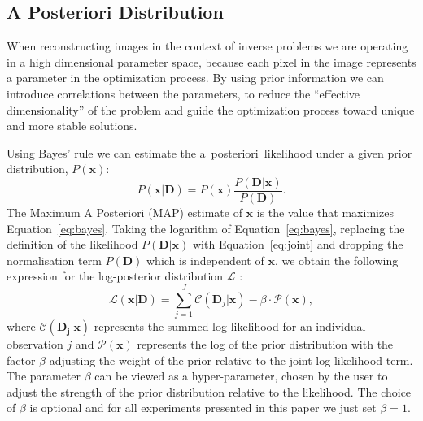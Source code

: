 \documentclass[twocolumn]{aastex631}
\newcommand{\aposteriori}{a~posteriori~}
\begin{document}
    \subsection{A Posteriori Distribution}
    When reconstructing images in the context of inverse problems we are operating in a high dimensional parameter space, because each pixel in the image represents a parameter in the optimization process. By using prior information we can introduce correlations between the parameters, to reduce the \enquote{effective dimensionality} of the problem and guide the optimization process toward unique and more stable solutions.
    
    Using Bayes' rule we can estimate the \aposteriori likelihood under a given prior distribution, $P(\mathbf{x} )$:
    \begin{equation}
        \label{eq:bayes}
        P(\mathbf{x}|\textbf{D}) = P(\mathbf{x} ) \frac{P(\textbf{D} |\mathbf{x})}{P(\textbf{D})}.
    \end{equation}
    The Maximum A Posteriori (MAP) estimate of $\mathbf{x}$ is the value that maximizes Equation~\ref{eq:bayes}.
    Taking the logarithm of Equation~\ref{eq:bayes}, replacing the definition of the likelihood $P(\mathbf{D}|\mathbf{x})$ with Equation~\ref{eq:joint} and dropping the normalisation term $P(\mathbf{D})$ which is independent of $\mathbf{x}$, we obtain the following expression for the log-posterior distribution
    $\mathcal{L}$ :
    \begin{equation}
        \label{eq:total}
        \mathcal{L}\left(\mathbf{x} | \mathbf{D} \right) = \sum_{j=1}^J \mathcal{C}\left( \mathbf{D}_j | \mathbf{x} \right) - \beta \cdot \mathcal{P}(\mathbf{x}),
    \end{equation}
    where $\mathcal{C}\left( \mathbf{D_j} | \mathbf{x} \right)$ represents the summed log-likelihood for an individual observation $j$ and $\mathcal{P}(\mathbf{x})$ represents the log of the prior distribution with the factor $\beta$ adjusting the weight of the prior relative to the joint log likelihood term. The parameter $\beta$ can be viewed as a hyper-parameter, chosen by the user to adjust the strength of the prior distribution relative to the likelihood. The choice of $\beta$ is optional and for all experiments presented in this paper we just set $\beta=1$. 
\end{document}
